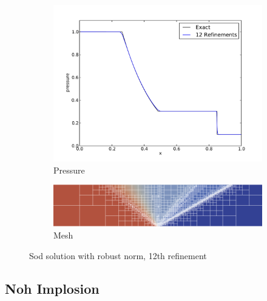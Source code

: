 \documentclass[Dissertation.tex]{subfiles}
\begin{document}
\begin{figure}[ht]
\begin{subfigure}[t]{0.45\textwidth}
\includegraphics[width=\textwidth]{Dissertation/Sod/Robust-pres13.pdf}
\caption{Pressure}
\end{subfigure}
\begin{subfigure}[t]{0.9\textwidth}
\centering
\includegraphics[width=\textwidth]{Dissertation/Sod/Robust-mesh13.png}
\caption{Mesh}
\end{subfigure}
\caption{Sod solution with robust norm, 12th refinement}
\label{fig:SodRobust12}
\end{figure}

\subsection{Noh Implosion}
\end{document}
